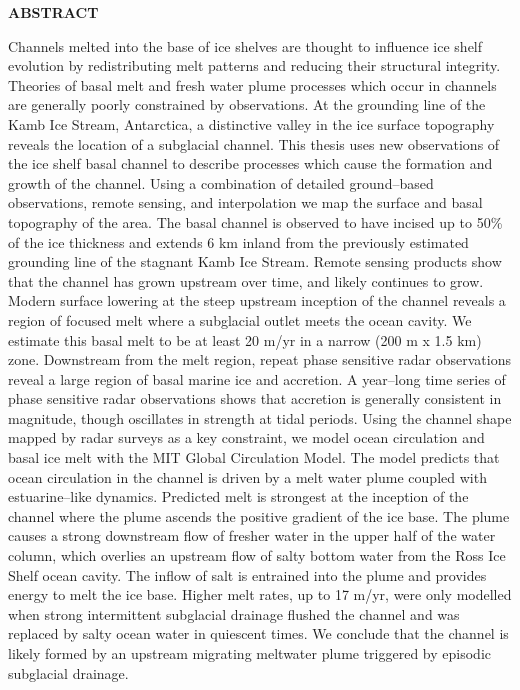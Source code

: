 \newpage
{}



\begin{center}
\textbf{ABSTRACT}
\end{center}
Channels melted into the base of ice shelves are thought to influence ice shelf evolution by redistributing melt patterns and reducing their structural integrity. Theories of basal melt and fresh water plume processes which occur in channels are generally poorly constrained by observations.
At the grounding line of the Kamb Ice Stream, Antarctica, a distinctive valley in the ice surface topography reveals the location of a subglacial channel.
This thesis uses new observations of the ice shelf basal channel to describe processes which cause the formation and growth of the channel. 
Using a combination of detailed ground--based observations, remote sensing, and interpolation we map the surface and basal topography of the area.
The basal channel is observed to have incised up to 50\% of the ice thickness and extends 6 km inland from the previously estimated grounding line of the stagnant Kamb Ice Stream.
Remote sensing products show that the channel has grown upstream over time, and likely continues to grow. Modern surface lowering at the steep upstream inception of the channel reveals a region of focused melt where a subglacial outlet meets the ocean cavity. We estimate this basal melt to be at least 20 m/yr in a narrow (200 m x 1.5 km) zone. Downstream from the melt region, repeat phase sensitive radar observations reveal a large region of basal marine ice and accretion. A year--long time series of phase sensitive radar observations shows that accretion is generally consistent in magnitude, though oscillates in strength at tidal periods.
Using the channel shape mapped by radar surveys as a key constraint, we model ocean circulation and basal ice melt with the MIT Global Circulation Model. The model predicts that ocean circulation in the channel is driven by a melt water plume coupled with  estuarine--like dynamics.
Predicted melt is strongest at the inception of the channel where the plume ascends the positive gradient of the ice base. The plume causes a strong downstream flow of fresher water in the upper half of the water column, which overlies an upstream flow of salty bottom water from the Ross Ice Shelf ocean cavity. The inflow of salt is entrained into the plume and provides energy to melt the ice base.
Higher melt rates, up to 17 m/yr, were only modelled when strong intermittent subglacial drainage flushed the channel and was replaced by salty ocean water in quiescent times. 
We conclude that the channel is likely formed by an upstream migrating meltwater plume triggered by episodic subglacial drainage. 





